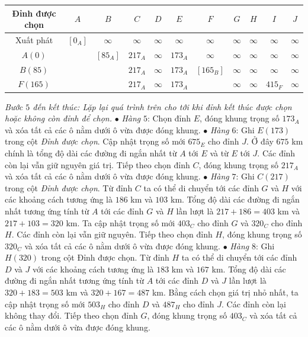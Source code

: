 \begin{multicols}{2}
\begin{table}[H]
{\begin{tabular}{|c|c|c|c|c|c|c|c|c|c|c|}
				\hline
				Đỉnh được chọn&$A$&	$B$&	$C$&	$D$&	$E$&	$F$&	$G$&	$H$&	$I$&	$J$\\
				\hline
				Xuất phát&	$[0_A ]$	&$\infty$&	$\infty$&	$\infty$	&$\infty$	&$\infty$&	$\infty$&	$\infty$&	$\infty$	&$\infty$\\
				\hline
				$A(0)$&		&$[85_A]$	&$217_A$&	$\infty$	&$173_A$&	$\infty$&	$\infty$&	$\infty$&	$\infty$&	$\infty$\\
				\hline
				$B(85)$	&	&	&$217_A$&	$\infty$&	$173_A$&	$[165_B]$&	$\infty$	&$\infty$&	$\infty$	&$\infty$\\
				\hline
				$F(165)$&	&	&	$217_A$&	$\infty$	&$173_A$	&	&$\infty$&	$\infty$&	$415_F$	&$\infty$\\
				\hline
		\end{tabular}}
		\vspace*{-10pt}
	\end{table}
	\textit{Bước $5$ đến kết thúc: Lặp lại quá trình trên cho tới khi đỉnh kết thúc được chọn hoặc không còn đỉnh để chọn.}
	\vskip 0.1cm 
	$\bullet$ \textit{Hàng} $5$: Chọn đỉnh $E$, đóng khung trọng số $173_A$ và xóa tất cả các ô nằm dưới ô vừa được đóng khung. 
	\vskip 0.1cm
	$\bullet$ \textit{Hàng} $6$: Ghi $E(173)$ trong cột \textit{Đỉnh được chọn}. Cập nhật trọng số mới $675_E$ cho đỉnh $J$. Ở đây $675$ km chính là tổng độ dài các đường đi ngắn nhất từ $A$ tới $E$ và từ $E$ tới $J$. Các đỉnh còn lại vẫn giữ nguyên giá trị. Tiếp theo chọn đỉnh $C$, đóng khung trọng số $217_A$ và xóa tất cả các ô nằm dưới ô vừa được đóng khung.
	\vskip 0.1cm 
	$\bullet$ \textit{Hàng} $7$: Ghi $C(217)$ trong cột \textit{Đỉnh được chọn}. Từ đỉnh $C$ ta có thể di chuyển tới các đỉnh $G$ và $H$ với các khoảng cách tương ứng là $186$ km và $103$ km. Tổng độ dài các đường đi ngắn nhất tương ứng tính từ $A$ tới các đỉnh $G$ và $H$ lần lượt là $217+186=403$ km và $217+103=320$ km. Ta cập nhật trọng số mới $403_C$ cho đỉnh $G$ và $320_C$ cho đỉnh $H$. Các đỉnh còn lại vẫn giữ nguyên. Tiếp theo chọn đỉnh $H$, đóng khung trọng số $320_C$ và xóa tất cả các ô nằm dưới ô vừa được đóng khung.
	\vskip 0.1cm
	$\bullet$ \textit{Hàng} $8$: Ghi $H(320)$ trong cột Đỉnh được chọn. Từ đỉnh $H$ ta có thể di chuyển tới các đỉnh $D$ và $J$ với các khoảng cách tương ứng là $183$ km và $167$ km. Tổng độ dài các đường đi ngắn nhất tương ứng tính từ $A$ tới các đỉnh $D$ và $J$ lần lượt là $320+183=503$ km và $320+167=487$ km. Bằng cách chọn giá trị nhỏ nhất, ta cập nhật trọng số mới $503_H$ cho đỉnh $D$ và $487_H$ cho đỉnh $J$. Các đỉnh còn lại không thay đổi. Tiếp theo chọn đỉnh $G$, đóng khung trọng số $403_C$ và xóa tất cả các ô nằm dưới ô vừa được đóng khung.

\end{multicols}
